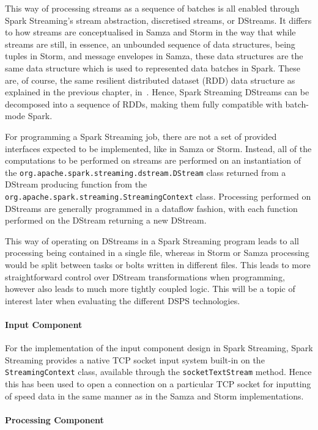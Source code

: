 This way of processing streams as a sequence of batches is all enabled through Spark Streaming's stream abstraction,
discretised streams, or DStreams. It differs to how streams are conceptualised in Samza and Storm in the way that while
streams are still, in essence, an unbounded sequence of data structures, being tuples in Storm, and message envelopes in
Samza, these data structures are the same data structure which is used to represented data batches in Spark. These are,
of course, the same resilient distributed dataset (RDD) data structure as explained in the previous chapter, in~.
Hence, Spark Streaming DStreams can be decomposed into a sequence of RDDs, making them fully compatible with batch-mode Spark.

For programming a Spark Streaming job, there are not a set of provided interfaces expected to be implemented, like in
Samza or Storm. Instead, all of the computations to be performed on streams are performed on an instantiation of the
\texttt{org.apache.spark.streaming.dstream.DStream} class returned from a DStream producing function from the
\texttt{org.apache.spark.streaming.StreamingContext} class. Processing performed on DStreams are generally programmed in
a dataflow fashion, with each function performed on the DStream returning a new DStream.

This way of operating on DStreams in a Spark Streaming program leads to all processing being contained in a single file,
whereas in Storm or Samza processing would be split between tasks or bolts written in different files. This leads to
more straightforward control over DStream transformations when programming, however also leads to much more tightly
coupled logic. This will be a topic of interest later when evaluating the different DSPS technologies.

\paragraph{Input Component}

For the implementation of the input component design in Spark Streaming, Spark Streaming provides a native TCP socket input
system built-in on the \texttt{StreamingContext} class, available through the \texttt{socketTextStream} method. Hence
this has been used to open a connection on a particular TCP socket for inputting of speed data in the same manner as in the
Samza and Storm implementations.

\paragraph{Processing Component}

